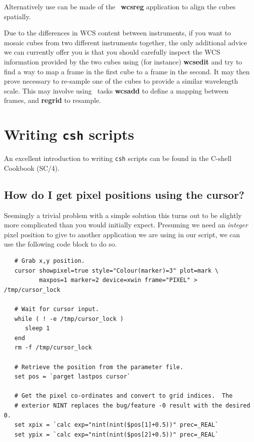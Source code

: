 \documentclass[twoside,11pt]{article}
\newcommand{\xref}[3]{#1}
\newcommand{\xlabel}[1]{}
\begin{document}
{Alternatively use can be made of the \CCDPACK\ 
\xref{{\bf wcsreg}}{sun139}{WCSREG} application to align the cubes spatially.

Due to the differences in WCS content between instruments, if you want
to mosaic cubes from two different instruments together, the only
additional advice we can currently offer you is that you should
carefully inspect the WCS information provided by the two cubes using
(for instance) \xref{{\bf wcsedit}}{sun139}{WCSEDIT} and try to find a way
to map a frame in the first cube to a frame in the second.  It may
then prove necessary to re-sample one of the cubes to provide a
similar wavelength scale.  This may involve using \KAPPA\ tasks
\xref{{\bf wcsadd}}{sun95}{WCSADD} to define a mapping between frames,
and \xref{{\bf regrid}}{sun95}{REGRID} to resample.

\newpage
\section{\xlabel{sc16_writingcsh}Writing {\tt csh} scripts\label{sc16_writingcsh}}

An excellent introduction to writing {\tt csh} scripts can be found in
the \xref{C-shell Cookbook}{sc4}{} (SC/4).

\subsection{How do I get pixel positions using the cursor?}

Seemingly a trivial problem with a simple solution this turns out to
be slightly more complicated than you would initially expect.
Presuming we need an {\em integer} pixel position to give to another
application we are using in our script, we can use the following code
block to do so.

\small\begin{verbatim}
   # Grab x,y position.
   cursor showpixel=true style="Colour(marker)=3" plot=mark \
          maxpos=1 marker=2 device=xwin frame="PIXEL" > /tmp/cursor_lock

   # Wait for cursor input.
   while ( ! -e /tmp/cursor_lock )
      sleep 1
   end
   rm -f /tmp/cursor_lock

   # Retrieve the position from the parameter file.
   set pos = `parget lastpos cursor`

   # Get the pixel co-ordinates and convert to grid indices.  The
   # exterior NINT replaces the bug/feature -0 result with the desired 0.
   set xpix = `calc exp="nint(nint($pos[1]+0.5))" prec=_REAL`
   set ypix = `calc exp="nint(nint($pos[2]+0.5))" prec=_REAL`
\end{verbatim}\normalsize

}
\end{document}
